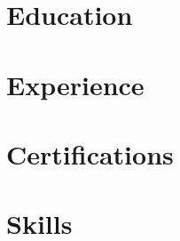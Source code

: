 





\section{Education}



\section{Experience}
\resumeSubHeadingListStart




\resumeSubHeadingListEnd

\section{Certifications}
\resumeSubHeadingListStart


\resumeSubHeadingListEnd

\section{Skills}


